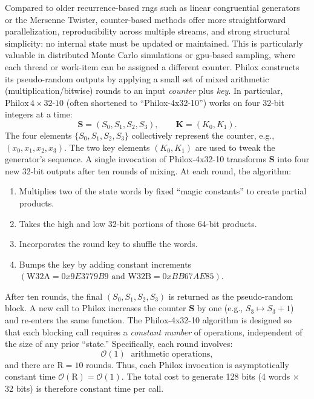 Compared to older recurrence-based \acrshort{rng}s such as linear congruential generators or the Mersenne Twister, counter-based methods offer more straightforward parallelization, reproducibility across multiple streams, and strong structural simplicity: no internal state must be updated or maintained. This is particularly valuable in distributed Monte Carlo simulations or \acrshort{gpu}-based sampling, where each thread or work-item can be assigned a different counter. Philox constructs its pseudo-random outputs by applying a small set of mixed arithmetic (multiplication/bitwise) rounds to an input \emph{counter} plus \emph{key}. In particular, \(\mathrm{Philox}\,4\times32\text{-10}\) (often shortened to “Philox-4x32-10”) works on four 32-bit integers at a time:
\[
  \mathbf{S} = (S_0, S_1, S_2, S_3),
  \qquad
  \mathbf{K} = (K_0, K_1).
\]
The four elements \(\{S_0, S_1, S_2, S_3\}\) collectively represent the counter, e.g., \((x_0, x_1, x_2, x_3)\). The two key elements \((K_0, K_1)\) are used to tweak the generator’s sequence. A single invocation of Philox-4x32-10 transforms \(\mathbf{S}\) into four new 32-bit outputs after ten rounds of mixing. At each round, the algorithm:
\begin{enumerate}
    \item Multiplies two of the state words by fixed “magic constants” to create partial products.
    \item Takes the high and low 32-bit portions of those 64-bit products.
    \item Incorporates the round key to shuffle the words.
    \item Bumps the key by adding constant increments \((\mathrm{W32A} = 0x9E3779B9 \text{ and } \mathrm{W32B} = 0xBB67AE85)\).
\end{enumerate}
After ten rounds, the final \((S_0, S_1, S_2, S_3)\) is returned as the pseudo-random block. A new call to Philox increases the counter \(\mathbf{S}\) by one (e.g., \(S_3 \mapsto S_3 + 1\)) and re-enters the same function. The Philox-4x32-10 algorithm is designed so that each blocking call requires a \emph{constant number} of operations, independent of the size of any prior “state.” Specifically, each round involves:
\[
  \mathcal{O}(1)\;\text{ arithmetic operations},
\]
and there are \(\mathrm{R} = 10\) rounds. Thus, each Philox invocation is asymptotically constant time \(\mathcal{O}(\mathrm{R}) = \mathcal{O}(1)\). The total cost to generate 128 bits (4 words \(\times\) 32 bits) is therefore constant time per call.

